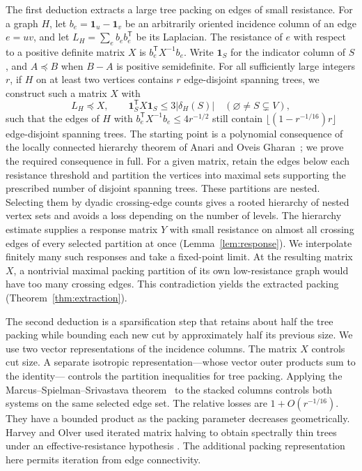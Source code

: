 \documentclass[11pt]{amsart}
\theoremstyle{definition}
\theoremstyle{remark}
\numberwithin{equation}{section}
\begin{document}
The first deduction extracts a large tree packing on edges of small
resistance. For a graph \(H\), let \(b_e=\mathbf1_u-\mathbf1_v\)
be an arbitrarily oriented incidence column of an edge \(e=uv\),
and let \(L_H=\sum_e b_eb_e^{\mathsf T}\) be its Laplacian.
The resistance of \(e\) with respect to a positive definite matrix
\(X\) is \(b_e^{\mathsf T}X^{-1}b_e\).
Write \(\mathbf1_S\) for the indicator column of \(S\), and
\(A\preceq B\) when \(B-A\) is positive semidefinite.
For all sufficiently large integers \(r\), if \(H\) on at least
two vertices contains \(r\) edge-disjoint spanning trees, we
construct such a matrix \(X\) with
\[
 L_H\preceq X,\qquad
 \mathbf1_S^{\mathsf T}X\mathbf1_S
 \le3|\delta_H(S)|
 \quad(\varnothing\ne S\subsetneq V),
\]
such that the edges of \(H\) with
\(b_e^{\mathsf T}X^{-1}b_e\le4r^{-1/2}\) still contain
\(\lfloor(1-r^{-1/16})r\rfloor\) edge-disjoint spanning trees.
The starting point is a polynomial consequence of the locally connected
hierarchy theorem of Anari and Oveis Gharan~\cite[Theorem~3.5]{AOG};
we prove the required consequence in full.
For a given matrix, retain the edges below each resistance threshold
and partition the vertices into maximal sets supporting the prescribed
number of disjoint spanning trees. These partitions are nested.
Selecting them by dyadic crossing-edge counts gives a rooted hierarchy
of nested vertex sets and avoids a loss depending on the number of
levels. The hierarchy estimate supplies a response matrix \(Y\) with
small resistance on almost all crossing edges of every selected
partition at once (Lemma~\ref{lem:response}). We interpolate finitely
many such responses and take a fixed-point limit. At the resulting
matrix \(X\), a nontrivial maximal packing partition of its own
low-resistance graph would have too many crossing edges. This
contradiction yields the extracted packing
(Theorem~\ref{thm:extraction}).

The second deduction is a sparsification step that retains about half
the tree packing while bounding each new cut by approximately half its
previous size. We use two vector representations of the incidence
columns. The matrix \(X\) controls cut size. A separate isotropic
representation---whose vector outer products sum to the identity---
controls the partition inequalities for tree packing.
Applying the Marcus--Spielman--Srivastava theorem~\cite{MSS} to the stacked
columns controls both systems on the same selected edge set.
The relative losses are \(1+O(r^{-1/16})\). They have a bounded product
as the packing parameter decreases geometrically.
Harvey and Olver used iterated matrix halving to obtain spectrally thin
trees under an effective-resistance hypothesis
\cite[Appendix~F]{HarveyOlver2014}. The additional packing
representation here permits iteration from edge connectivity.
\end{document}
